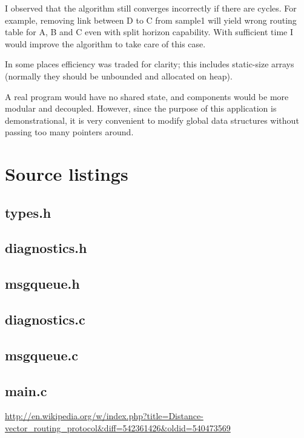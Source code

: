 \documentclass[english,11pt]{article}
\newcommand{\listing}[1]{
    \subsection{#1}
    \label{lst:#1}
    {\small }
}
\begin{document}
I observed that the algorithm still converges incorrectly if there are cycles.
For example, removing link between D to C from sample1 will yield wrong routing
table for A, B and C even with split horizon capability. With sufficient time I
would improve the algorithm to take care of this case.

In some places efficiency was traded for clarity; this includes static-size
arrays (normally they should be unbounded and allocated on heap).

A real program would have no shared state, and components would be more modular
and decoupled. However, since the purpose of this application is
demonstrational, it is very convenient to modify global data structures without
passing too many pointers around.

\section{Source listings}
\listing{types.h}
\listing{diagnostics.h}
\listing{msgqueue.h}
\listing{diagnostics.c}
\listing{msgqueue.c}
\listing{main.c}

\clearpage
\begin{thebibliography}{9}

    \url{
    http://en.wikipedia.org/w/index.php?title=Distance-vector_routing_protocol&diff=542361426&oldid=540473569
    }

\end{thebibliography}
\end{document}

